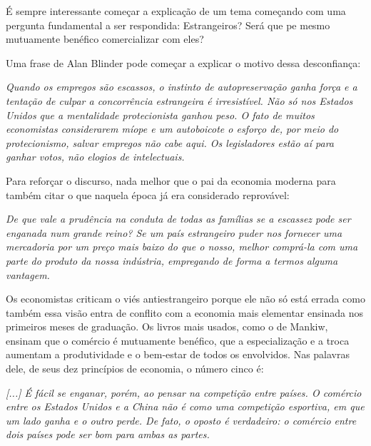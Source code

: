 É sempre interessante começar a explicação de um tema começando com uma pergunta fundamental a ser respondida: Estrangeiros? Será que pe mesmo mutuamente benéfico comercializar com eles?

Uma frase de Alan Blinder pode começar a explicar o motivo dessa desconfiança:

\begin{citacao}
    \textit{
        Quando os empregos são escassos, o instinto de autopreservação ganha força e a tentação de culpar a concorrência estrangeira é irresistível. Não só nos Estados Unidos que a mentalidade protecionista ganhou peso. O fato de muitos economistas considerarem míope e um autoboicote o esforço de, por meio do protecionismo, salvar empregos não cabe aqui. Os legisladores estão aí para ganhar votos, não elogios de intelectuais.
     } \newline 
    \cite{blinder1987hard}
\end{citacao}

Para reforçar o discurso, nada melhor que o pai da economia moderna para também citar o que naquela época já era considerado reprovável:

\begin{citacao}
    \textit{
         De que vale a prudência na conduta de todas as famílias se a escassez pode ser enganada num grande reino? Se um país estrangeiro puder nos fornecer uma mercadoria por um preço mais baixo do que o nosso, melhor comprá-la com uma parte do produto da nossa indústria, empregando de forma a termos alguma vantagem.
    } \newline
    \cite{smith1776inquiry}
\end{citacao}

Os economistas criticam o viés antiestrangeiro porque ele não só está errada como também essa visão entra de conflito com a economia mais elementar ensinada nos primeiros meses de graduação. Os livros mais usados, como o de Mankiw, ensinam que o comércio é mutuamente benéfico, que a especialização e a troca aumentam a produtividade e o bem-estar de todos os envolvidos. Nas palavras dele, de seus dez princípios de economia, o número cinco é:

\begin{citacao}
    \textit{
        [...] É fácil se enganar, porém, ao pensar na competição entre países. O comércio entre os Estados Unidos e a China não é como uma competição esportiva, em que um lado ganha e o outro perde. De fato, o oposto é verdadeiro: o comércio entre dois países pode ser bom para ambas as partes.
    } \newline
    \cite{mankiw2020introducao}
\end{citacao}

